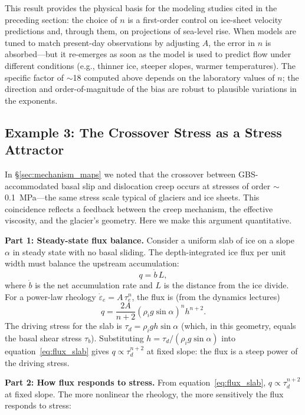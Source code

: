 \documentclass[11pt]{article}
\begin{document}
\noindent This result provides the physical basis for the modeling studies cited in the preceding section: the choice of $n$ is a first-order control on ice-sheet velocity predictions and, through them, on projections of sea-level rise.  When models are tuned to match present-day observations by adjusting $A$, the error in $n$ is absorbed---but it re-emerges as soon as the model is used to predict flow under different conditions (e.g., thinner ice, steeper slopes, warmer temperatures).  The specific factor of $\sim$18 computed above depends on the laboratory values of $n$; the direction and order-of-magnitude of the bias are robust to plausible variations in the exponents.

\subsection{Example 3: The Crossover Stress as a Stress Attractor}
\label{sec:example_attractor}

In \S\ref{sec:mechanism_maps} we noted that the crossover between GBS-accommodated basal slip and dislocation creep occurs at stresses of order $\sim$0.1~MPa---the same stress scale typical of glaciers and ice sheets.  This coincidence reflects a feedback between the creep mechanism, the effective viscosity, and the glacier's geometry.  Here we make this argument quantitative.

\medskip
\noindent\textbf{Part 1: Steady-state flux balance.}  Consider a uniform slab of ice on a slope $\alpha$ in steady state with no basal sliding.  The depth-integrated ice flux per unit width must balance the upstream accumulation:
\begin{equation}
  q = \dot{b}\,L,
\end{equation}
where $\dot{b}$ is the net accumulation rate and $L$ is the distance from the ice divide.  For a power-law rheology $\dot{\varepsilon}_e = A\,\tau_e^n$, the flux is (from the dynamics lectures)
\begin{equation}
  q = \frac{2A}{n+2}\left(\rho_i g \sin\alpha\right)^n h^{n+2}.
  \label{eq:flux_slab}
\end{equation}
The driving stress for the slab is $\tau_d = \rho_i g h \sin\alpha$ (which, in this geometry, equals the basal shear stress $\tau_b$).  Substituting $h = \tau_d / (\rho_i g \sin\alpha)$ into equation~\eqref{eq:flux_slab} gives $q \propto \tau_d^{n+2}$ at fixed slope: the flux is a steep power of the driving stress.

\medskip
\noindent\textbf{Part 2: How flux responds to stress.}  From equation~\eqref{eq:flux_slab}, $q \propto \tau_d^{n+2}$ at fixed slope.  The more nonlinear the rheology, the more sensitively the flux responds to stress:
\end{document}
